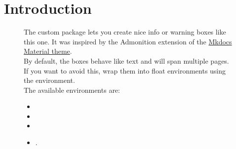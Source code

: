 \chapter{Introduction} \label{chap:intro}

\begin{figure}[ht!]
    \begin{infobox}
        The custom package  lets you create nice info or warning boxes like this one. It was inspired by the Admonition extension of the \href{https://squidfunk.github.io/mkdocs-material/extensions/admonition/}{Mkdocs Material theme}. \\
        By default, the boxes behave like text and will span multiple pages. If you want to avoid this, wrap them into float environments using the  environment. \\
    
        The available environments are:
        \begin{itemize}
            \item {}
            \item {}
            \item {}
            \item {}.
        \end{itemize}
    \end{infobox}
\end{figure}

\lipsum[1-20]
